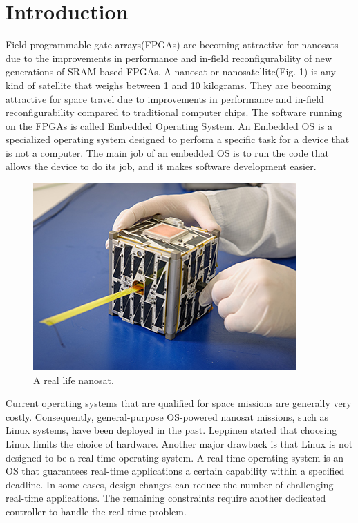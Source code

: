 \documentclass[conference]{IEEEtran}
\begin{document}
\section{Introduction}
Field-programmable gate arrays(FPGAs) are becoming attractive for nanosats due to the improvements in 
performance and in-field reconfigurability of new generations of SRAM-based FPGAs. A nanosat or nanosatellite(Fig. 1)
is any kind of satellite that weighs between 1 and 10 kilograms. They are becoming attractive for space travel due to improvements 
in performance and in-field reconfigurability compared to traditional computer chips.
The software running on the FPGAs is called Embedded Operating System. An Embedded OS is a specialized operating system
designed to perform a specific task for a device that is not a computer. The main job of an embedded OS is to run the 
code that allows the device to do its job, and it makes software development easier. 
\begin{figure}[ht]
    \centering
    \includegraphics[scale = 2.5]{nanosat.jpg}
    \caption{A real life nanosat.}
\end{figure}
Current operating systems that are qualified for space missions are generally very costly. Consequently, general-purpose
OS-powered nanosat missions, such as Linux systems, have been deployed in the past. Leppinen \cite{b1} stated that choosing 
Linux limits the choice of hardware. Another major drawback is that Linux is not designed to be a real-time operating 
system. A real-time operating system is an OS that guarantees real-time applications a certain capability within a specified 
deadline. In some cases, design changes can reduce the number of challenging real-time applications. The remaining constraints 
require another dedicated controller to handle the real-time problem. 

\end{document}
